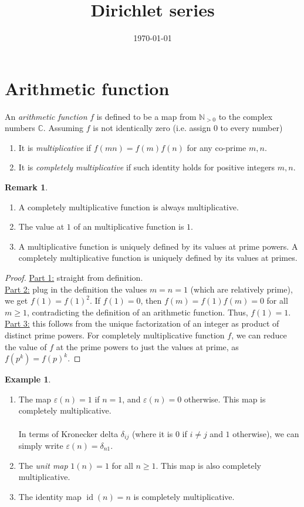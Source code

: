\documentclass{article}
\title{Dirichlet series}
\date{\today}
\theoremstyle{definition}
\newtheorem{example}[theorem]{Example}
\newtheorem{remark}[theorem]{Remark}
\begin{document}
\maketitle
\tableofcontents

\newpage

\section{Arithmetic function}
An \emph{arithmetic function} $f$ is defined to be a map from $\mathbb{N}_{> 0}$ to the complex numbers $\mathbb{C}$. Assuming $f$ is not identically zero (i.e. assign $0$ to every number)
\begin{enumerate}
	\item It is \emph{multiplicative} if $f(mn) = f(m) f(n)$ for any co-prime $m, n$.
	\item It is \emph{completely multiplicative} if such identity holds for  positive integers $m, n$.
\end{enumerate}
\begin{remark} \ 
\begin{enumerate}
	\item A completely multiplicative function is always multiplicative.
	\item The value at $1$ of an multiplicative function is $1$.
	\item A multiplicative function is uniquely defined by its values at prime powers. A completely multiplicative function is uniquely defined by its values at primes.
\end{enumerate}
\end{remark}
\begin{proof}
\underline{Part 1:} straight from definition.
\\
\underline{Part 2:} plug in the definition the values $m = n = 1$ (which are relatively prime), we get $f(1) = f(1)^2$. If $f(1) = 0$, then $f(m) = f(1) f(m) = 0$ for all $m \geq 1$, contradicting the definition of an arithmetic function. Thus, $f(1) = 1$.
\\
\underline{Part 3:} this follows from the unique factorization of an integer as product of distinct prime powers. For completely multiplicative function $f$, we can reduce the value of $f$ at the prime powers to just the values at prime, as $f(p^k) = f(p)^k$.
\end{proof}
\begin{example} \ 
\begin{enumerate}
	\item The map $\varepsilon(n) = 1$ if $n = 1$, and $\varepsilon(n) = 0$ otherwise. This map is completely multiplicative.
	\\
	\\
	In terms of Kronecker delta $\delta_{ij}$ (where it is $0$ if $i \neq j$ and $1$ otherwise), we can simply write $\varepsilon(n) = \delta_{n1}$.
	\item The \emph{unit map} $1(n) = 1$ for all $n \geq 1$. This map is also completely multiplicative.
	\item The identity map $\operatorname{id} (n) = n$ is completely multiplicative.
\end{enumerate}
\end{example}
\end{document}
